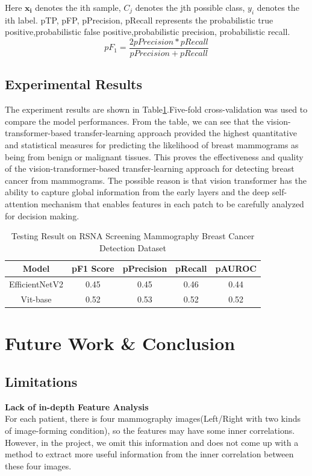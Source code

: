 \documentclass{article}
\begin{document}
Here $\mathbf{x}_{\mathbf{i}}$ denotes the ith sample, $C_j$ denotes the jth possible class, $y_i$ denotes the ith label. pTP, pFP, pPrecision, pRecall represents the probabilistic true positive,probabilistic false positive,probabilistic precision, probabilistic recall. 
\begin{equation}
pF_1 =\frac{2p Precision*pRecall}{p Precision+p Recall}
\end{equation}

\subsection{Experimental Results}
The experiment results are shown in Table\ref{table:result}.Five-fold cross-validation was used to compare the model performances. From the table, we can see that the vision-transformer-based transfer-learning approach provided the highest quantitative and statistical measures for predicting the likelihood of breast mammograms as being from benign or malignant tissues. This proves the effectiveness and quality of the vision-transformer-based transfer-learning approach for detecting breast cancer from mammograms. The possible reason is that vision transformer has the ability to capture global information from the early layers and the deep self-attention mechanism that enables features in each patch to be carefully analyzed for decision making.

\renewcommand{\heavyrulewidth}{1.1pt}
\begin{table}[h!]
\centering
\begin{tabular}{ ccccc }
\toprule
Model & pF1 Score &pPrecision &pRecall &pAUROC\\
\midrule
EfficientNetV2\cite{tan2021efficientnetv2} & 0.45 &0.45 &0.46 &0.44 \\
Vit-base &  0.52 & 0.53 &0.52 &0.52\\

\bottomrule
\end{tabular}

\caption{Testing Result on RSNA Screening Mammography Breast Cancer Detection Dataset}
\label{table:result}
\end{table}


\section{Future Work \& Conclusion}


\subsection{Limitations}
\textbf{Lack of in-depth Feature Analysis}\\
For each patient, there is four mammography images(Left/Right with two kinds of image-forming condition), so the features may have some inner correlations. However, in the project, we omit this information and does not come up with a method to extract more useful information from the inner correlation between these four images.
\end{document}
